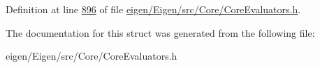 Definition at line \hyperlink{eigen_2_eigen_2src_2_core_2_core_evaluators_8h_source_l00896}{896} of file \hyperlink{eigen_2_eigen_2src_2_core_2_core_evaluators_8h_source}{eigen/\+Eigen/src/\+Core/\+Core\+Evaluators.\+h}.



The documentation for this struct was generated from the following file\+:\begin{DoxyCompactItemize}
\item 
eigen/\+Eigen/src/\+Core/\+Core\+Evaluators.\+h\end{DoxyCompactItemize}
